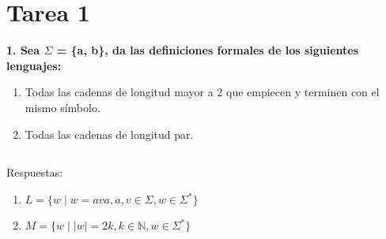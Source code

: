 \renewcommand{\labelenumi}{\alph{enumi})}
\section*{Tarea 1}
\textbf{1. Sea $\Sigma$ = \{a, b\}, 
da las definiciones formales de los siguientes lenguajes:}

\begin{enumerate}
    \item Todas las cadenas de longitud mayor a 2 que empiecen y terminen con el mismo s\'imbolo.    
    \item Todas las cadenas de longitud par.
\end{enumerate}

\subsection*{}{Respuestas: }


\begin{enumerate}
    \item $L = \{w \mid w = ava , a,v \in \Sigma, w \in \Sigma^{*}\}$
    \item $M = \{w \mid |w| = 2k , k \in \mathbb{N}, w \in \Sigma^{*}\}$
\end{enumerate}